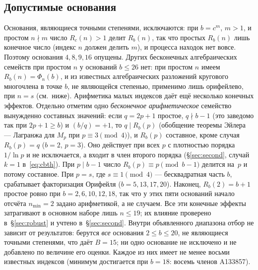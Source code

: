\documentclass[11pt,a4paper]{article}
\theoremstyle{plain}
\theoremstyle{remark}
\newcommand{\Rb}{R_b}
\begin{document}
\subsection{Допустимые основания}\label{sec:bases}
Основания, являющиеся точными степенями, исключаются: при $b=c^{m}$, $m>1$, и
простом $n\nmid m$ число $R_c(n)>1$ делит $\Rb(n)$, так что простых $\Rb(n)$ лишь
конечное число (индекс $n$ должен делить $m$), и процесса находок нет вовсе.
Поэтому основания $4,8,9,16$ опущены. Других бесконечных алгебраических семейств
при простом $n$ у оснований $b\le26$ нет: при простом $n$ имеем $\Rb(n)=\Phi_n(b)$,
и из известных алгебраических разложений кругового многочлена в точке $b$, не
являющейся степенью, применимо лишь орифейлево, при $n=s$ (см.\ ниже). Арифметика малых
индексов даёт ещё несколько конечных эффектов. Отдельно отметим одно
\emph{бесконечное арифметическое} семейство вынужденно составных значений: если
$q=2p+1$ простое, $q\nmid b-1$ (это заведомо так при $2p+1\ge b$) и $(b/q)=+1$, то
$q\mid\Rb(p)$ (обобщение теоремы Эйлера ---
Лагранжа для $M_p$ при $p\equiv3\pmod4$), и $\Rb(p)$ составное, кроме случая
$\Rb(p)=q$ ($b=2$, $p=3$). Оно действует при всех $p$ с плотностью
порядка $1/\ln p$ и не исключается, а входит в член второго порядка
(\S\ref{sec:second}, случай $k=1$ в~\eqref{eq:cbth}). При $p\mid b-1$ число $\Rb(p)\equiv p\pmod{b-1}$ делится на~$p$
и потому составное. При $p=s$, где $s\equiv1\pmod4$ --- бесквадратная часть $b$,
срабатывает факторизация Орифейля ($b=5,13,17,20$). Наконец, $\Rb(2)=b+1$ простое
ровно при $b=2,6,10,12,18$, так что у этих пяти оснований начало отсчёта
$n_{\min}=2$ задано арифметикой, а не случаем. Все эти конечные эффекты затрагивают
в основном наборе лишь $n\le19$; их влияние проверено в~\S\ref{sec:robust} и учтено в~\S\ref{sec:second}. Внутри объявленного диапазона отбор
не зависит от результатов: берутся \emph{все} основания $2\le b\le20$, не являющиеся
точными степенями, что даёт $B=15$; ни одно основание не исключено и не добавлено
по величине его оценки. Каждое из них имеет не менее восьми известных индексов
(минимум достигается при $b=18$: восемь членов A133857).
\end{document}
